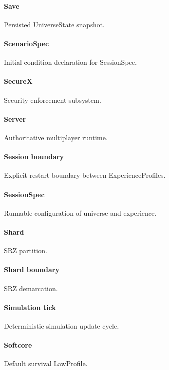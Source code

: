 \documentclass[9pt,a4paper,openany]{book}
\begin{document}
\paragraph{Save}
Persisted UniverseState snapshot.\allowbreak{}


\paragraph{ScenarioSpec}
Initial condition declaration for SessionSpec.\allowbreak{}


\paragraph{SecureX}
Security enforcement subsystem.\allowbreak{}


\paragraph{Server}
Authoritative multiplayer runtime.\allowbreak{}


\paragraph{Session boundary}
Explicit restart boundary between ExperienceProfiles.\allowbreak{}


\paragraph{SessionSpec}
Runnable configuration of universe and experience.\allowbreak{}


\paragraph{Shard}
SRZ partition.\allowbreak{}


\paragraph{Shard boundary}
SRZ demarcation.\allowbreak{}


\paragraph{Simulation tick}
Deterministic simulation update cycle.\allowbreak{}


\paragraph{Softcore}
Default survival LawProfile.\allowbreak{}
\end{document}
